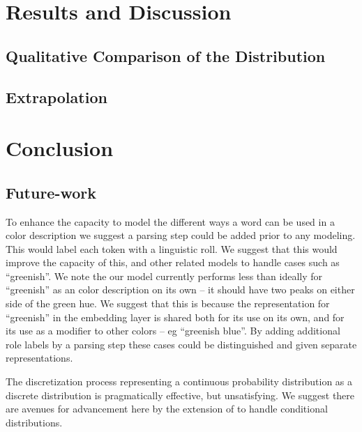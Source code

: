 \documentclass[11pt,letterpaper]{article}
\newcommand{\textcite}{\newcite}
\begin{document}
\section{Results and Discussion}

\subsection{Qualitative Comparison of the Distribution}


\subsection{Extrapolation}





\section{Conclusion}


\subsection{Future-work}
To enhance the capacity to model the different ways a word can be used in a color description we suggest a parsing step could be added prior to any modeling.
This would label each token with a linguistic roll.
We suggest that this would improve the capacity of this, and other related models to handle cases such as ``greenish''.
We note the our model currently performs less than ideally for ``greenish'' as an color description on its own -- it should have two peaks on either side of the green hue.
We suggest that this is because the representation for ``greenish'' in the embedding layer is shared both for its use on its own, and for its use as a modifier to other colors -- eg ``greenish blue''.
By adding additional role labels by a parsing step these cases could be distinguished and given separate representations.


The discretization process representing a continuous probability distribution as a discrete distribution is pragmatically effective, but unsatisfying.
We suggest there are avenues for advancement here by the extension of \textcite{magdon1998neural} to handle conditional distributions.





\end{document}
